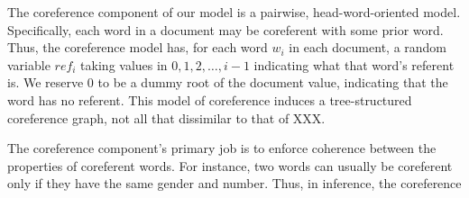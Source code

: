\documentclass[11pt,letter]{article}
\begin{document}
The coreference component of our model is a pairwise, head-word-oriented model.
Specifically, each word in a document may be coreferent with some prior word.
Thus, the coreference model has, for each word $w_i$ in each document, a random
variable $ref_{i}$ taking values in ${0, 1, 2, \ldots, i-1}$ indicating what
that word's referent is.  We reserve 0 to be a dummy root of the document
value, indicating that the word has no referent. This model of coreference
induces a tree-structured coreference graph, not all that dissimilar to 
that of XXX.

The coreference component's primary job is to enforce coherence between the
properties of coreferent words. For instance, two words can usually be
coreferent only if they have the same gender and number. Thus, in inference,
the coreference



\end{document}
